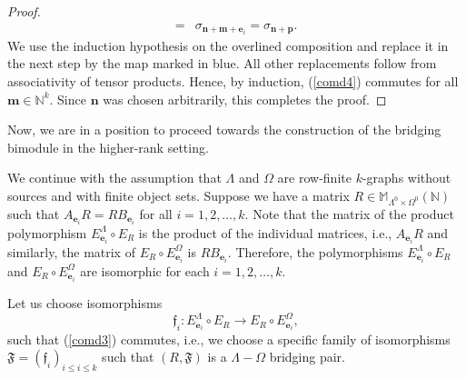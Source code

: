 \documentclass[12pt]{amsart}
\newcommand{\N}{\mathbf{n}}
\newcommand{\M}{\mathbf{m}}
\theoremstyle{definition}
\theoremstyle{remark}
\begin{document}
\begin{proof}
{\begin{align*}
    =&\sigma_{\N+\M+\mathbf{e}_i}=\sigma_{\N+\mathbf{p}}.
\end{align*}
}
We use the induction hypothesis on the overlined composition and replace it in the next step by the map marked in blue. All other replacements follow from associativity of tensor products. Hence, by induction, (\ref{comd4}) commutes for all $\M\in \mathbb{N}^k$. Since $\N$ was chosen arbitrarily, this completes the proof.
\end{proof}

Now, we are in a position to proceed towards the construction of the bridging bimodule in the higher-rank setting. 

We continue with the assumption that $\Lambda$ and $\Omega$ are row-finite $k$-graphs without sources and with finite object sets. Suppose we have a matrix $R\in \mathbb{M}_{\Lambda^0\times \Omega^0}(\mathbb{N})$ such that $A_{\mathbf{e}_i}R=RB_{\mathbf{e}_i}$ for all $i=1,2,\ldots,k$. Note that the matrix of the product polymorphism $E_{\mathbf{e}_i}^\Lambda\circ E_R$ is the product of the individual matrices, i.e., $A_{\mathbf{e}_i}R$ and similarly, the matrix of $E_R\circ E_{\mathbf{e}_i}^\Omega$ is $RB_{\mathbf{e}_i}$. Therefore, the polymorphisms $E_{\mathbf{e}_i}^\Lambda\circ E_R$ and $E_R\circ E_{\mathbf{e}_i}^\Omega$ are isomorphic for each $i=1,2,\ldots,k$. 

Let us choose isomorphisms 
\[\mathfrak{f}_i:E_{\mathbf{e}_i}^\Lambda\circ E_R\longrightarrow E_R\circ E_{\mathbf{e}_i}^\Omega,\] such that (\ref{comd3}) commutes, i.e., we choose a specific family of isomorphisms $\mathfrak{F}=(\mathfrak{f}_i)_{i\le i\le k}$ such that $(R,\mathfrak{F})$ is a $\Lambda-\Omega$ bridging pair. 
\end{document}

